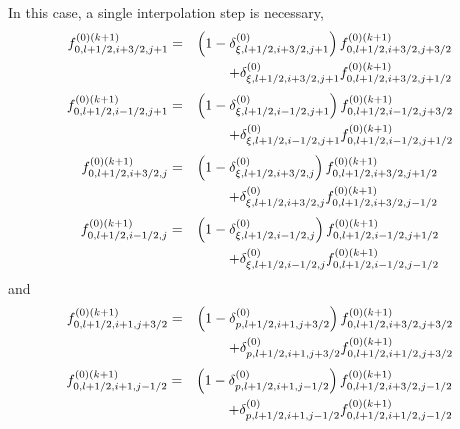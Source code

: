 In this case, a single interpolation step is necessary, 
\begin{eqnarray}
f_{0,l+1/2,i+3/2,j+1}^{\left( 0\right) (k+1)} &=&\left( 1-\delta _{\xi
,l+1/2,i+3/2,j+1}^{\left( 0\right) }\right) f_{0,l+1/2,i+3/2,j+3/2}^{\left(
0\right) (k+1)}  \notag \\
&&+\delta _{\xi ,l+1/2,i+3/2,j+1}^{\left( 0\right)
}f_{0,l+1/2,i+3/2,j+1/2}^{\left( 0\right) (k+1)}
\end{eqnarray}%
\begin{eqnarray}
f_{0,l+1/2,i-1/2,j+1}^{\left( 0\right) (k+1)} &=&\left( 1-\delta _{\xi
,l+1/2,i-1/2,j+1}^{\left( 0\right) }\right) f_{0,l+1/2,i-1/2,j+3/2}^{\left(
0\right) (k+1)}  \notag \\
&&+\delta _{\xi ,l+1/2,i-1/2,j+1}^{\left( 0\right)
}f_{0,l+1/2,i-1/2,j+1/2}^{\left( 0\right) (k+1)}
\end{eqnarray}%
\begin{eqnarray}
f_{0,l+1/2,i+3/2,j}^{\left( 0\right) (k+1)} &=&\left( 1-\delta _{\xi
,l+1/2,i+3/2,j}^{\left( 0\right) }\right) f_{0,l+1/2,i+3/2,j+1/2}^{\left(
0\right) (k+1)}  \notag \\
&&+\delta _{\xi ,l+1/2,i+3/2,j}^{\left( 0\right)
}f_{0,l+1/2,i+3/2,j-1/2}^{\left( 0\right) (k+1)}
\end{eqnarray}%
\begin{eqnarray}
f_{0,l+1/2,i-1/2,j}^{\left( 0\right) (k+1)} &=&\left( 1-\delta _{\xi
,l+1/2,i-1/2,j}^{\left( 0\right) }\right) f_{0,l+1/2,i-1/2,j+1/2}^{\left(
0\right) (k+1)}  \notag \\
&&+\delta _{\xi ,l+1/2,i-1/2,j}^{\left( 0\right)
}f_{0,l+1/2,i-1/2,j-1/2}^{\left( 0\right) (k+1)}
\end{eqnarray}%
and%
\begin{eqnarray}
f_{0,l+1/2,i+1,j+3/2}^{\left( 0\right) (k+1)} &=&\left( 1-\delta
_{p,l+1/2,i+1,j+3/2}^{\left( 0\right) }\right)
f_{0,l+1/2,i+3/2,j+3/2}^{\left( 0\right) (k+1)}  \notag \\
&&+\delta _{p,l+1/2,i+1,j+3/2}^{\left( 0\right)
}f_{0,l+1/2,i+1/2,j+3/2}^{\left( 0\right) (k+1)}
\end{eqnarray}%
\begin{eqnarray}
f_{0,l+1/2,i+1,j-1/2}^{\left( 0\right) (k+1)} &=&\left( 1-\delta
_{p,l+1/2,i+1,j-1/2}^{\left( 0\right) }\right)
f_{0,l+1/2,i+3/2,j-1/2}^{\left( 0\right) (k+1)}  \notag \\
&&+\delta _{p,l+1/2,i+1,j-1/2}^{\left( 0\right)
}f_{0,l+1/2,i+1/2,j-1/2}^{\left( 0\right) (k+1)}
\end{eqnarray}%
